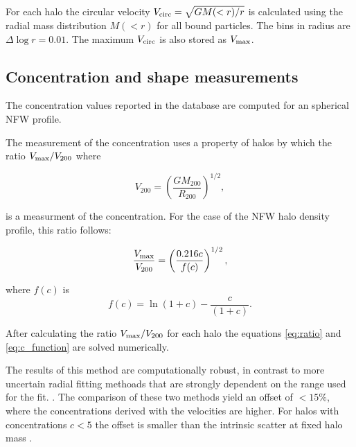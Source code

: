 For each halo the circular velocity $V_{\rm circ}=\sqrt{GM(<r)/r}$ is
calculated using  the radial mass distribution $M(<r)$ for all bound
particles. The bins in radius are $\Delta \log r=0.01$. The maximum
$V_{\rm circ}$ is also stored as $V_{\rm max}$.

\subsection{Concentration and shape measurements}


The concentration values reported in the database are computed for an
spherical NFW profile.  

The measurement of the concentration uses a property of halos by which
the ratio $V_{\rm max}/V_{\rm 200}$ where

\begin{equation}
V_{200} = \left(\frac{GM_{200}}{R_{200}}\right)^{1/2},
\end{equation}

is a measurment of the concentration. For the case of the NFW halo
density profile, this ratio follows:

\begin{equation}
\frac{V_{\rm max}}{V_{\rm 200}} = \left(\frac{0.216
  c}{f(c)}\right)^{1/2}, 
\label{eq:ratio}
\end{equation}

where $f(c)$ is
\begin{equation}
f(c) = \ln(1+c) - \frac{c}{(1+c)}.
\label{eq:c_function}
\end{equation}

After calculating the ratio $V_{\rm max}/V_{\rm 200}$ for each halo
the equations \ref{eq:ratio} and \ref{eq:c_function} are solved
numerically. 

The results of this method are computationally robust, in contrast to
more uncertain radial fitting methoads that are strongly dependent on
the range used for the fit. \citep{Klypin:2010qw,Meneghetti2013}. The
comparison of these two methods yield an offset of $<15\%$, where the
concentrations derived with the velocities are
higher. For halos with concentrations $c<5$ the offset is smaller than
the intrinsic scatter at fixed halo mass \citep{Prada2012}.

